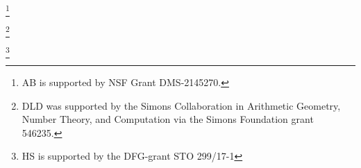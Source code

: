 
\author[Bourdon]{Abbey Bourdon}
\address{
  Abbey Bourdon,
  Wake Forest University,
  Department of Mathematics, 127 Manchester Hall, PO Box 7388, Winston-Salem, NC 27109
}
\thanks{AB is supported by NSF Grant DMS-2145270.}

\author[Hashimoto]{Sachi Hashimoto}
\address{%
  Sachi Hashimoto,
  Max Planck Institut für Mathematik in den Naturwissenschaften,
  Inselstraße 22,
  04103 Leipzig
}


\author[Keller]{Timo Keller}
\address{Timo Keller, Leibniz Universität Hannover, Institut für Algebra, Zahlentheorie und Diskrete Mathematik, Welfengarten 1, 30167 Hannover, Germany}

\author[Klagsbrun]{Zev Klagsbrun}
\address{Zev Klagsbrun, Center for Communications Research, San Diego, CA}



\author[Lowry-Duda]{David Lowry-Duda}
\address{%
  David Lowry-Duda, ICERM, 121 South Main Street, Box E, 11th Floor,
  Providence, RI, 02903
}
\thanks{%
  DLD was supported by the Simons Collaboration in Arithmetic Geometry, Number
  Theory, and Computation via the Simons Foundation grant 546235.
}
\author[Morrison]{Travis Morrison}
\address{Travis Morrison, 
Virginia Tech Department of Mathematics, 
226 Stanger Street, 
24061 Blacksburg, VA USA}

\author[Najman]{Filip Najman}
\address{
Filip Najman, University of Zagreb, Bijeni\v{c}ka Cesta 30, 10000 Zagreb, Croatia
}


\author[Shukla]{Himanshu Shukla}
\address{Himanshu Shukla, Mathematisches Institut, Uiversit\"{a}t Bayreuth, Universit\"{a}tstrasse 30, 95444 Bayreuth, Germany}
\thanks{HS is supported by the DFG-grant STO 299/17-1}

